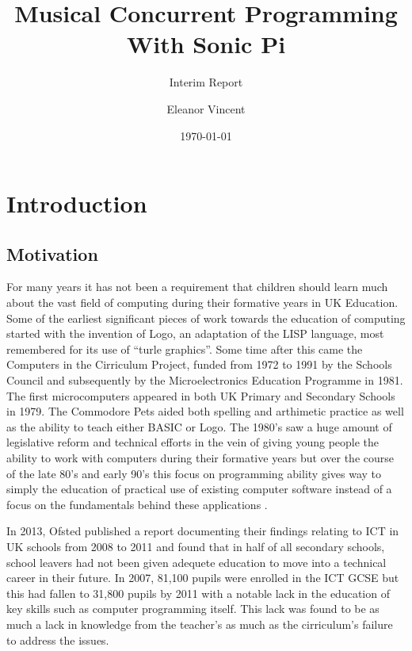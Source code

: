 \documentclass[11pt]{scrartcl}
\begin{document}
\title{Musical Concurrent Programming \\ With Sonic Pi}
\subtitle{Interim Report}
\author{Eleanor Vincent}
\date{\today}
\maketitle

\section{Introduction}

\subsection{Motivation}
For many years it has not been a requirement that children should learn much
about the vast field of computing during their formative years in UK Education.
Some of the earliest significant pieces of work towards the education of
computing started with the invention of Logo, an adaptation of the LISP 
language, most remembered for its use of ``turle graphics''. Some time after 
this came the Computers in the Cirriculum Project, funded from 1972 to 1991 by 
the Schools Council and subsequently by the Microelectronics Education 
Programme in 1981. The first microcomputers appeared in both UK Primary and 
Secondary Schools in 1979. The Commodore Pets aided both spelling and 
arthimetic practice as well as the ability to teach either BASIC or Logo. The 
1980's saw a huge amount of legislative reform and technical efforts in the 
vein of giving young people the ability to work with computers during their 
formative years but over the course of the late 80's and early 90's this focus 
on programming ability gives way to simply the education of practical use of 
existing computer software instead of a focus on the fundamentals behind these 
applications \cite{naec}.

In 2013, Ofsted published a report documenting their findings relating to ICT 
in UK schools from 2008 to 2011 and found that in half of all secondary 
schools, school leavers had not been given adequete education to move into a 
technical career in their future. In 2007, 81,100 pupils were enrolled in the 
ICT GCSE but this had fallen to 31,800 pupils by 2011 \cite{DfEO13} with a 
notable lack in the education of key skills such as computer programming 
itself. This lack was found to be as much a lack in knowledge from the 
teacher's as much as the cirriculum's failure to address the issues.
\end{document}
